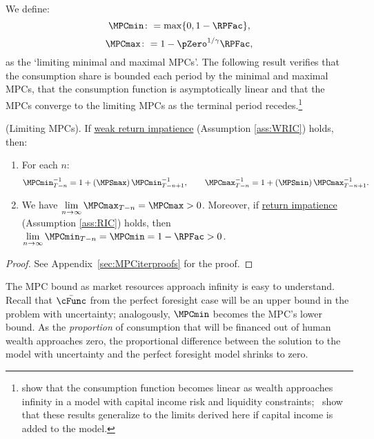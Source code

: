 \documentclass[BufferStockTheory]{subfiles}
\begin{document}
We define:
%
\hypertarget{MPCmaxDefn}{}\hypertarget{MPCminDefn}{}
\begin{equation}
\MPCmin \colon = \max\{0,1- \RPFac\}, \label{eq:MPCminDefn}
\end{equation}
\begin{equation}
\MPCmax \colon = 1 - \pZero^{1/\gamma}\RPFac, \label{eq:MPCmaxDefn}
\end{equation}
as the `limiting minimal and maximal MPCs'.
The following result verifies that the consumption share is bounded each period by the minimal and maximal MPCs, that the consumption function is asymptotically linear and that the MPCs converge to the limiting MPCs as the terminal period recedes.\footnote{\cite{benhabibWealth} show that the consumption function becomes linear as wealth approaches infinity in a model with capital income risk and liquidity constraints;~\cite{maTodaRich} show that these results generalize to the limits derived here if capital income is added to the model.} 
\hypertarget{cFuncBounds}{}

\begin{lemma}(Limiting MPCs).
\label{lemm:MPC}
If \hyperlink{WRIC}{weak return impatience} (Assumption \ref{ass:WRIC}) holds, then:

\begin{enumerate}[label=(\roman*)]
\item For each $n$:
%
\begin{equation}\label{eq:MPCminInv}
\MPCmin_{T-n}^{-1}  = 1+\left(\MPSmax\right) \MPCmin_{T-n+1}^{-1}, \qquad \MPCmax_{T-n}^{-1}   = 1+\left(\MPSmin\right) \MPCmax_{T-n+1}^{-1}.
\end{equation}

\item  We have $\lim\limits_{n \rightarrow \infty }\MPCmax_{T-n} = \MPCmax>0$. Moreover, if \hyperlink{RIC}{return impatience} (Assumption \ref{ass:RIC}) holds, then $\lim\limits_{n \rightarrow  \infty}\MPCmin_{T-n} = \MPCmin = 1- \RPFac>0$.

\end{enumerate}
\end{lemma}
\begin{proof}\let\qed\relax
  See Appendix~\ref{sec:MPCiterproofs} for the proof. 
  \end{proof}

The MPC bound as market resources approach infinity is easy to understand.
Recall that $\bar{\cFunc}$ from the perfect foresight case will be an upper bound in the problem with uncertainty; analogously, $\MPCmin$ becomes the MPC's lower bound.
As the \textit{proportion} of consumption that will be financed out of human wealth approaches zero, the proportional difference between the solution to the model with uncertainty and the perfect foresight model shrinks to zero.
\end{document}
